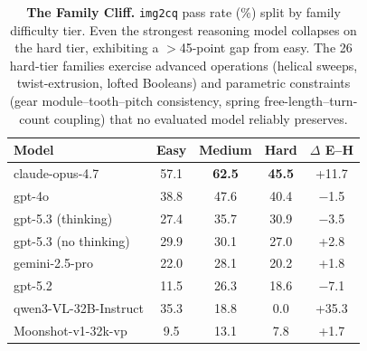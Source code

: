 \begin{table}[t]                            
  \centering                                                                                                                      
  \small
  \setlength{\tabcolsep}{5pt}                 
  \renewcommand{\arraystretch}{1.15}      
  \caption{\textbf{The Family Cliff.} \texttt{img2cq} pass rate (\%) split by family difficulty tier. Even the strongest reasoning model collapses on
  the hard tier, exhibiting a $>$45-point gap from easy. The 26 hard-tier families exercise advanced operations (helical sweeps, twist-extrusion,     
  lofted Booleans) and parametric constraints (gear module--tooth--pitch consistency, spring free-length--turn-count coupling) that no evaluated model
   reliably preserves.}                                                                                                                               
  \label{tab:family_cliff}                                                                                                                            
  \begin{tabular}{l c c c c}
  \toprule                                                                                                                                            
  Model & Easy & Medium & Hard & $\Delta$ E--H \\                 
  \midrule
  claude-opus-4.7        & 57.1          & \textbf{62.5} & \textbf{45.5} & +11.7 \\                                                                   
  gpt-4o                 & 38.8          & 47.6          & 40.4          & $-$1.5 \\
  gpt-5.3 (thinking)     & 27.4          & 35.7          & 30.9          & $-$3.5 \\                                                                  
  gpt-5.3 (no thinking)  & 29.9          & 30.1          & 27.0          & +2.8  \\
  gemini-2.5-pro         & 22.0          & 28.1          & 20.2          & +1.8  \\                                                                   
  gpt-5.2                & 11.5          & 26.3          & 18.6          & $-$7.1 \\
  qwen3-VL-32B-Instruct  & 35.3          & 18.8          & 0.0           & +35.3 \\                                                                   
  Moonshot-v1-32k-vp     & 9.5           & 13.1          & 7.8           & +1.7  \\                                                                   

\end{tabular}
\end{table}
